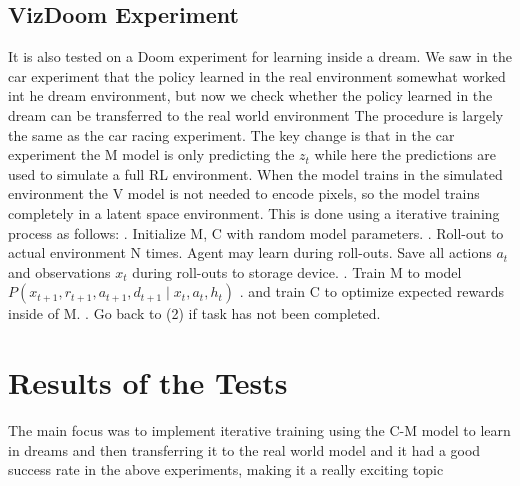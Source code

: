 \documentclass[a4paper]{article}
\begin{document}
\subsection{VizDoom Experiment}
It is also tested on a Doom experiment for learning inside a dream. We saw in the car experiment that the policy learned in the real environment somewhat worked int he dream environment, but now we check whether the policy learned in the dream can be transferred to the real world environment The procedure is largely the same as the car racing experiment. The key change is that in the car experiment the M model is only predicting the $z_t$ while here the predictions are used to simulate a full RL environment. 
\newline
When the model trains in the simulated environment the V model is not needed to encode pixels, so the model trains completely in a latent space environment. This is done using a iterative training process as follows:
\newline
{}. 
Initialize M, C with random model parameters.
\newline
{}. 
Roll-out to actual environment N times. Agent may learn during roll-outs. Save all actions $a_t$  and observations $x_t$  during roll-outs to storage device.
\newline
{}. 
Train M to model 
$P(x_{t+1}, r_{t+1}, a_{t+1}, d_{t+1} \; | \; x_t, a_t, h_t)$
\newline
{}. 
 and train C to optimize expected rewards inside of M.
 \newline
 . 
Go back to (2) if task has not been completed.
\section{Results of the Tests}
The main focus was to implement iterative training using the C-M model to learn in dreams and then transferring it to the real world model and it had a good success rate in the above experiments, making it a really exciting topic 
\newline
\printbibliography
\end{document}
